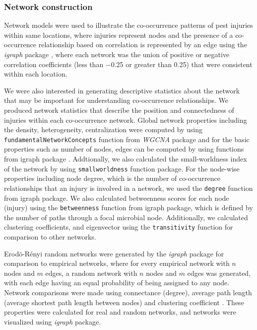 \subsubsection{Network construction}

Network models were used to illustrate the co-occurrence patterns of pest injuries within same locations, where injuries represent nodes and the presence of a co-occurrence relationship based on correlation is represented by an edge using the \textit{igraph} package \citep{Csardi_2010_igraph}, where each network was the union of positive or negative correlation coefficients (less than −0.25 or greater than 0.25) that were consistent within each location. 

We were also interested in generating descriptive statistics about the network that may be important for understanding co-occurrence relationships. We produced network statistics that describe the position and connectedness of injuries within each co-occurrence network. Global network properties including the density, heterogeneity, centralization were computed by using \texttt{fundamentalNetworkConcepts} function from  \textit{WGCNA} package \cite{Langfelder_2008} and for the basic properties such as number of nodes, edges can be computed by using functions from igraph package . Addtionally, we also calculated the small-worldness index of the network by using \texttt{smallworldness} function  package. For the node-wise properties including node degree, which is the number of co-occurrence relationships that an injury is involved in a network, we used the \texttt{degree} function from igraph package. We also calculated betweenness scores for each node (injury) using the \texttt{betweenness} function from igraph package, which is defined by the number of paths through a focal microbial node. Additionally, we calculated clustering coefficients, and eigenvector using the \texttt{transitivity} function for comparison to other networks. 

Erod\"{o}-R\'{e}nyi random networks were generated by the \textit{igraph} package for comparison to empirical networks, where for every empirical network with $n$ nodes and $m$ edges, a random network with $n$ nodes and $m$ edges was generated, with each edge having an equal probability of being assigned to any node. Network comparisons were made using connectance (degree),  average path length (average shortest path length between nodes) and clustering coefficient \citep{Kolaczyk_2014_Statistical}. These properties were calculated for real and random networks, and networks were visualized using \textit{igraph} package. 

